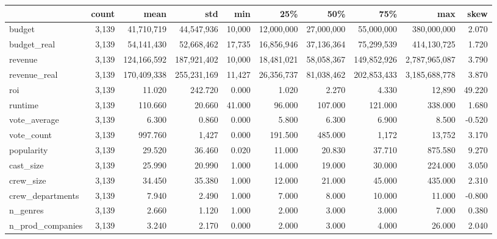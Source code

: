 \begin{tabular}{lrrrrrrrrr}
\toprule
 & count & mean & std & min & 25\% & 50\% & 75\% & max & skew \\
\midrule
budget & 3,139 & 41,710,719 & 44,547,936 & 10,000 & 12,000,000 & 27,000,000 & 55,000,000 & 380,000,000 & 2.070 \\
budget\_real & 3,139 & 54,141,430 & 52,668,462 & 17,735 & 16,856,946 & 37,136,364 & 75,299,539 & 414,130,725 & 1.720 \\
revenue & 3,139 & 124,166,592 & 187,921,402 & 10,000 & 18,481,021 & 58,058,367 & 149,852,926 & 2,787,965,087 & 3.790 \\
revenue\_real & 3,139 & 170,409,338 & 255,231,169 & 11,427 & 26,356,737 & 81,038,462 & 202,853,433 & 3,185,688,778 & 3.870 \\
roi & 3,139 & 11.020 & 242.720 & 0.000 & 1.020 & 2.270 & 4.330 & 12,890 & 49.220 \\
runtime & 3,139 & 110.660 & 20.660 & 41.000 & 96.000 & 107.000 & 121.000 & 338.000 & 1.680 \\
vote\_average & 3,139 & 6.300 & 0.860 & 0.000 & 5.800 & 6.300 & 6.900 & 8.500 & -0.520 \\
vote\_count & 3,139 & 997.760 & 1,427 & 0.000 & 191.500 & 485.000 & 1,172 & 13,752 & 3.170 \\
popularity & 3,139 & 29.520 & 36.460 & 0.020 & 11.000 & 20.830 & 37.710 & 875.580 & 9.270 \\
cast\_size & 3,139 & 25.990 & 20.990 & 1.000 & 14.000 & 19.000 & 30.000 & 224.000 & 3.050 \\
crew\_size & 3,139 & 34.450 & 35.380 & 1.000 & 12.000 & 21.000 & 45.000 & 435.000 & 2.310 \\
crew\_departments & 3,139 & 7.940 & 2.490 & 1.000 & 7.000 & 8.000 & 10.000 & 11.000 & -0.800 \\
n\_genres & 3,139 & 2.660 & 1.120 & 1.000 & 2.000 & 3.000 & 3.000 & 7.000 & 0.380 \\
n\_prod\_companies & 3,139 & 3.240 & 2.170 & 0.000 & 2.000 & 3.000 & 4.000 & 26.000 & 2.040 \\
\bottomrule
\end{tabular}